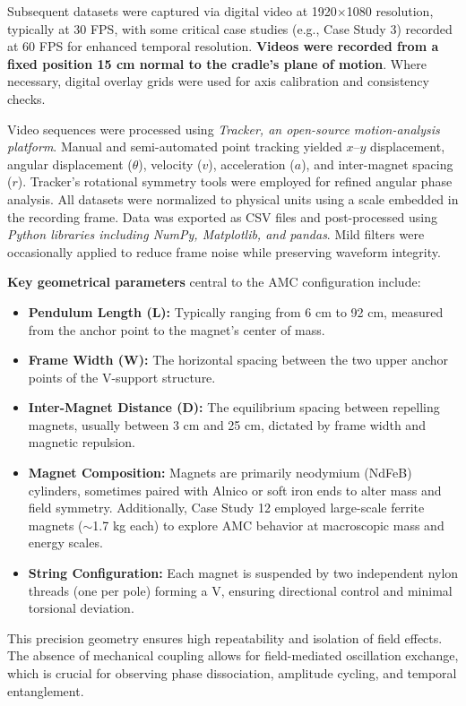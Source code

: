 \documentclass[10pt,aps,pre,onecolumn,superscriptaddress,notitlepage]{revtex4-2}
\begin{document}
Subsequent datasets were captured via digital video at 1920$\times$1080 resolution, typically at 30 FPS, with some critical case studies (e.g., Case Study 3) recorded at 60 FPS for enhanced temporal resolution. \textbf{Videos were recorded from a fixed position 15 cm normal to the cradle’s plane of motion}. Where necessary, digital overlay grids were used for axis calibration and consistency checks.

Video sequences were processed using \textit{Tracker, an open-source motion-analysis platform}. Manual and semi-automated point tracking yielded $x$--$y$ displacement, angular displacement ($\theta$), velocity ($v$), acceleration ($a$), and inter-magnet spacing ($r$). Tracker’s rotational symmetry tools were employed for refined angular phase analysis. All datasets were normalized to physical units using a scale embedded in the recording frame. Data was exported as CSV files and post-processed using \textit{Python libraries including NumPy, Matplotlib, and pandas}. Mild filters were occasionally applied to reduce frame noise while preserving waveform integrity.

\textbf{Key geometrical parameters} central to the AMC configuration include:
\begin{itemize}
    \item \textbf{Pendulum Length (L):} Typically ranging from 6 cm to 92 cm, measured from the anchor point to the magnet’s center of mass.
    \item \textbf{Frame Width (W):} The horizontal spacing between the two upper anchor points of the V-support structure.
    \item \textbf{Inter-Magnet Distance (D):} The equilibrium spacing between repelling magnets, usually between 3 cm and 25 cm, dictated by frame width and magnetic repulsion.
    \item \textbf{Magnet Composition:} Magnets are primarily neodymium (NdFeB) cylinders, sometimes paired with Alnico or soft iron ends to alter mass and field symmetry. Additionally, Case Study 12 employed large-scale ferrite magnets ($\sim$1.7 kg each) to explore AMC behavior at macroscopic mass and energy scales.
    \item \textbf{String Configuration:} Each magnet is suspended by two independent nylon threads (one per pole) forming a V, ensuring directional control and minimal torsional deviation.
\end{itemize}

This precision geometry ensures high repeatability and isolation of field effects. The absence of mechanical coupling allows for field-mediated oscillation exchange, which is crucial for observing phase dissociation, amplitude cycling, and temporal entanglement.
\end{document}
